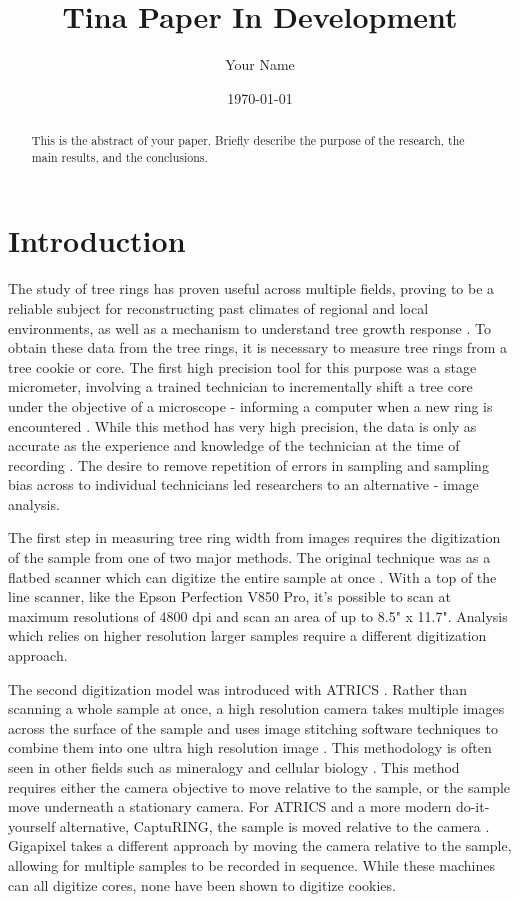 \documentclass[a4paper,12pt]{article}
\title{Tina Paper In Development}
\author{Your Name}
\date{\today}
\begin{document}
\maketitle

\begin{abstract}
    This is the abstract of your paper. Briefly describe the purpose of the research, the main results, and the conclusions.
\end{abstract}

\section{Introduction}
The study of tree rings has proven useful across multiple fields, proving to be a reliable subject for reconstructing past climates of regional and local environments, as well as a mechanism to understand tree growth response \citep{fritts_dendroclimatology_1971} \citep{williams_using_2010} \citep{guibal_dendrochronology_2021} \citep{sheppard_dendroclimatology_2010}.
To obtain these data from the tree rings, it is necessary to measure tree rings from a tree cookie or core. The first high precision tool for this purpose was a stage micrometer, involving a trained technician to incrementally shift a tree core under the objective of a microscope - informing a computer when a new ring is encountered \citep{robinson_microcomputer_nodate}.
While this method has very high precision, the data is only as accurate as the experience and knowledge of the technician at the time of recording \citep{levanic_atrics_2007}.
The desire to remove repetition of errors in sampling and sampling bias across to individual technicians led researchers to an alternative - image analysis. 

The first step in measuring tree ring width from images requires the digitization of the sample from one of two major methods.  
The original technique was as a flatbed scanner which can digitize the entire sample at once \citep{guay_new_1992}. 
With a top of the line scanner, like the Epson Perfection V850 Pro, it's possible to scan at maximum resolutions of 4800 dpi and scan an area of up to 8.5" x 11.7".
Analysis which relies on higher resolution larger samples require a different digitization approach. 

The second digitization model was introduced with ATRICS \citep{levanic_atrics_2007}. 
Rather than scanning a whole sample at once, a high resolution camera takes multiple images across the surface of the sample and uses image stitching software techniques to combine them into one ultra high resolution image \citep{muhlich_stitching_2022}.
This methodology is often seen in other fields such as mineralogy and cellular biology \citep{ro_image_2021,mohammadi_fast_2024}. 
This method requires either the camera objective to move relative to the sample, or the sample move underneath a stationary camera. 
For ATRICS and a more modern do-it-yourself alternative, CaptuRING, the sample is moved relative to the camera \citep{garcia-hidalgo_capturing_2022}. 
Gigapixel takes a different approach by moving the camera relative to the sample, allowing for multiple samples to be recorded in sequence. 
While these machines can all digitize cores, none have been shown to digitize cookies.
\end{document}
